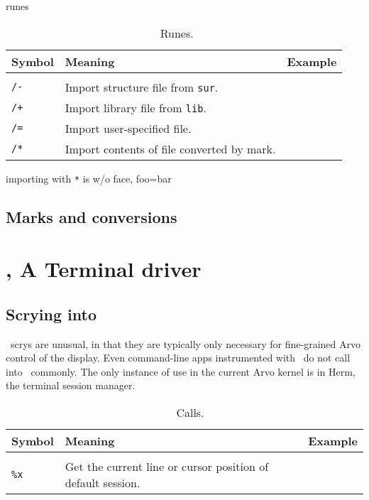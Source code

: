 runes

\begin{table}[h!]
  \begin{center}
    \caption{\ford~Runes.}
    \label{ha:ford}
    \begin{tabular}{lll}
      Symbol & Meaning & Example \\
      \hline \\
      \texttt{/-} & Import structure file from \texttt{sur}. & \\
      \texttt{/+} & Import library file from \texttt{lib}. & \\
      \texttt{/=} & Import user-specified file. & \\
      \texttt{/*} & Import contents of file converted by mark. & \\
    \end{tabular}
  \end{center}
\end{table}

importing with \texttt{*} is w/o face, foo=bar


\subsection[Marks]{Marks and conversions}

\section[\dill]{\dill, A Terminal driver}

\subsection{Scrying into \dill}

\dill~scrys are unusual, in that they are typically only necessary for fine-grained Arvo control of the display.  Even command-line apps instrumented with \shoe~do not call into \dill~commonly.  The only instance of use in the current Arvo kernel is in Herm, the terminal session manager.

\begin{table}[h!]
  \begin{center}
    \caption{\dill~\dotket~Calls.}
    \label{ha:dill}
    \begin{tabular}{lll}
      Symbol & Meaning & Example \\
      \hline \\
      \texttt{\%x} & Get the current line or cursor position of default session. & \\
    \end{tabular}
  \end{center}
\end{table}


